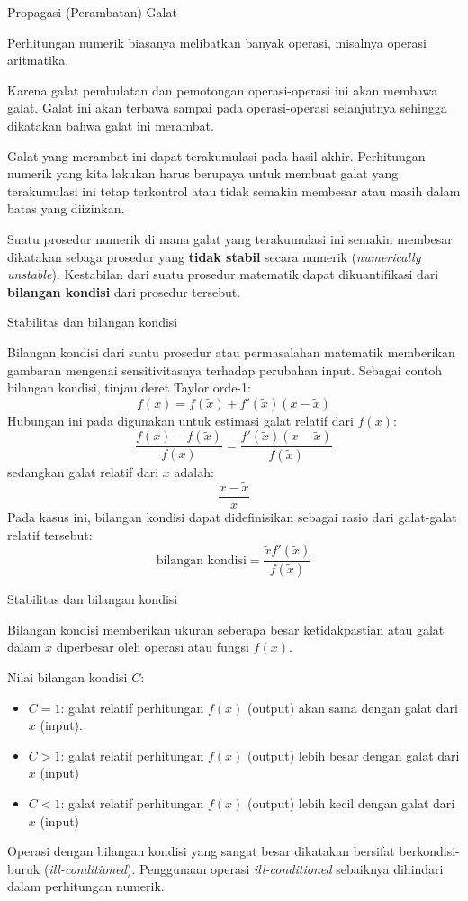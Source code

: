 \begin{frame}{Propagasi (Perambatan) Galat}

Perhitungan numerik biasanya melibatkan banyak operasi, misalnya operasi aritmatika.

Karena galat pembulatan dan pemotongan operasi-operasi ini akan membawa galat.
Galat ini akan terbawa sampai pada operasi-operasi selanjutnya sehingga dikatakan
bahwa galat ini merambat.

Galat yang merambat ini dapat terakumulasi pada hasil akhir.
Perhitungan numerik yang kita lakukan harus berupaya untuk membuat
galat yang terakumulasi ini tetap terkontrol atau tidak semakin membesar
atau masih dalam batas yang diizinkan.

Suatu prosedur numerik di mana galat yang terakumulasi ini semakin
membesar dikatakan sebaga prosedur yang \textbf{tidak stabil} secara numerik
(\textit{numerically unstable}). Kestabilan dari suatu prosedur
matematik dapat dikuantifikasi dari \textbf{bilangan kondisi} dari prosedur tersebut.

\end{frame}



\begin{frame}{Stabilitas dan bilangan kondisi}
\fontsize{9}{10}\selectfont

Bilangan kondisi dari suatu prosedur atau permasalahan matematik memberikan
gambaran mengenai sensitivitasnya terhadap perubahan input.
Sebagai contoh bilangan kondisi, tinjau deret Taylor orde-1:
$$
f(x) = f(\tilde{x}) + f'(\tilde{x})(x - \tilde{x})
$$
Hubungan ini pada digunakan untuk estimasi galat relatif dari $f(x)$:
$$
\frac{f(x) - f(\tilde{x})}{f(x)} = \frac{f'(\tilde{x})(x - \tilde{x})}{f(\tilde{x})}
$$
sedangkan galat relatif dari $x$ adalah:
$$
\frac{x - \tilde{x}}{\tilde{x}}
$$
Pada kasus ini, bilangan kondisi dapat didefinisikan sebagai rasio dari galat-galat
relatif tersebut:
$$
\text{bilangan kondisi} = \frac{\tilde{x}f'(\tilde{x})}{f(\tilde{x})}
$$
\end{frame}


\begin{frame}{Stabilitas dan bilangan kondisi}

Bilangan kondisi memberikan ukuran seberapa besar ketidakpastian atau galat dalam
$x$ diperbesar oleh operasi atau fungsi $f(x)$.

Nilai bilangan kondisi $C$:
\begin{itemize}
\item $C = 1$: galat relatif perhitungan $f(x)$ (output) akan sama
dengan galat dari $x$ (input).
\item $C > 1$: galat relatif perhitungan $f(x)$ (output) lebih besar
dengan galat dari $x$ (input)
\item $C < 1$: galat relatif perhitungan $f(x)$ (output) lebih kecil
dengan galat dari $x$ (input)
\end{itemize}
Operasi dengan bilangan kondisi yang sangat besar dikatakan
bersifat berkondisi-buruk (\textit{ill-conditioned}).
Penggunaan operasi \textit{ill-conditioned} sebaiknya dihindari
dalam perhitungan numerik.


\end{frame}


